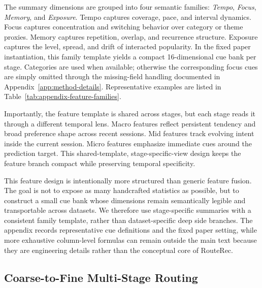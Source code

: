 \documentclass[sigconf,review,anonymous]{acmart}
\begin{document}
The summary dimensions are grouped into four semantic families: \textit{Tempo}, \textit{Focus}, \textit{Memory}, and \textit{Exposure}. Tempo captures coverage, pace, and interval dynamics. Focus captures concentration and switching behavior over category or theme proxies. Memory captures repetition, overlap, and recurrence structure. Exposure captures the level, spread, and drift of interacted popularity. In the fixed paper instantiation, this family template yields a compact 16-dimensional cue bank per stage. Categories are used when available; otherwise the corresponding focus cues are simply omitted through the missing-field handling documented in Appendix~\ref{app:method-details}. Representative examples are listed in Table~\ref{tab:appendix-feature-families}.

Importantly, the feature template is shared across stages, but each stage reads it through a different temporal lens. Macro features reflect persistent tendency and broad preference shape across recent sessions. Mid features track evolving intent inside the current session. Micro features emphasize immediate cues around the prediction target. This shared-template, stage-specific-view design keeps the feature branch compact while preserving temporal specificity.

This feature design is intentionally more structured than generic feature fusion. The goal is not to expose as many handcrafted statistics as possible, but to construct a small cue bank whose dimensions remain semantically legible and transportable across datasets. We therefore use stage-specific summaries with a consistent family template, rather than dataset-specific deep side branches. The appendix records representative cue definitions and the fixed paper setting, while more exhaustive column-level formulas can remain outside the main text because they are engineering details rather than the conceptual core of RouteRec.

\subsection{Coarse-to-Fine Multi-Stage Routing}
\end{document}
